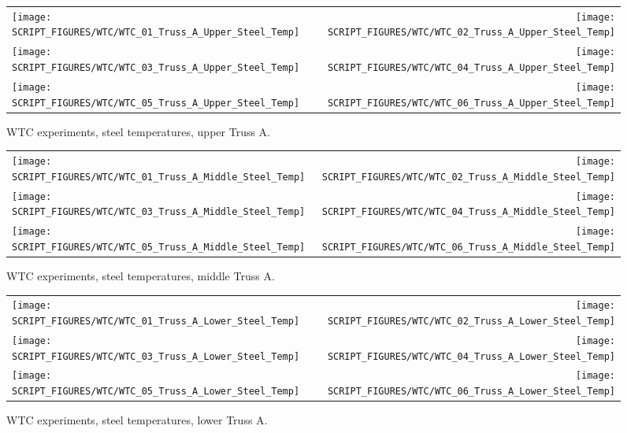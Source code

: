 \begin{figure}[p]
\begin{tabular*}{\textwidth}{l@{\extracolsep{\fill}}r}
\texttt{[image: SCRIPT\_FIGURES/WTC/WTC\_01\_Truss\_A\_Upper\_Steel\_Temp]} &
\texttt{[image: SCRIPT\_FIGURES/WTC/WTC\_02\_Truss\_A\_Upper\_Steel\_Temp]} \\
\texttt{[image: SCRIPT\_FIGURES/WTC/WTC\_03\_Truss\_A\_Upper\_Steel\_Temp]} &
\texttt{[image: SCRIPT\_FIGURES/WTC/WTC\_04\_Truss\_A\_Upper\_Steel\_Temp]} \\
\texttt{[image: SCRIPT\_FIGURES/WTC/WTC\_05\_Truss\_A\_Upper\_Steel\_Temp]} &
\texttt{[image: SCRIPT\_FIGURES/WTC/WTC\_06\_Truss\_A\_Upper\_Steel\_Temp]}
\end{tabular*}
\caption{WTC experiments, steel temperatures, upper Truss A.}
\label{NIST_WTC_Truss_A_Upper_Steel_Temp}
\end{figure}

\begin{figure}[p]
\begin{tabular*}{\textwidth}{l@{\extracolsep{\fill}}r}
\texttt{[image: SCRIPT\_FIGURES/WTC/WTC\_01\_Truss\_A\_Middle\_Steel\_Temp]} &
\texttt{[image: SCRIPT\_FIGURES/WTC/WTC\_02\_Truss\_A\_Middle\_Steel\_Temp]} \\
\texttt{[image: SCRIPT\_FIGURES/WTC/WTC\_03\_Truss\_A\_Middle\_Steel\_Temp]} &
\texttt{[image: SCRIPT\_FIGURES/WTC/WTC\_04\_Truss\_A\_Middle\_Steel\_Temp]} \\
\texttt{[image: SCRIPT\_FIGURES/WTC/WTC\_05\_Truss\_A\_Middle\_Steel\_Temp]} &
\texttt{[image: SCRIPT\_FIGURES/WTC/WTC\_06\_Truss\_A\_Middle\_Steel\_Temp]}
\end{tabular*}
\caption{WTC experiments, steel temperatures, middle Truss A.}
\label{NIST_WTC_Truss_A_Middle_Steel_Temp}
\end{figure}

\begin{figure}[p]
\begin{tabular*}{\textwidth}{l@{\extracolsep{\fill}}r}
\texttt{[image: SCRIPT\_FIGURES/WTC/WTC\_01\_Truss\_A\_Lower\_Steel\_Temp]} &
\texttt{[image: SCRIPT\_FIGURES/WTC/WTC\_02\_Truss\_A\_Lower\_Steel\_Temp]} \\
\texttt{[image: SCRIPT\_FIGURES/WTC/WTC\_03\_Truss\_A\_Lower\_Steel\_Temp]} &
\texttt{[image: SCRIPT\_FIGURES/WTC/WTC\_04\_Truss\_A\_Lower\_Steel\_Temp]} \\
\texttt{[image: SCRIPT\_FIGURES/WTC/WTC\_05\_Truss\_A\_Lower\_Steel\_Temp]} &
\texttt{[image: SCRIPT\_FIGURES/WTC/WTC\_06\_Truss\_A\_Lower\_Steel\_Temp]}
\end{tabular*}
\caption{WTC experiments, steel temperatures, lower Truss A.}
\label{NIST_WTC_Truss_A_Lower_Steel_Temp}
\end{figure}


